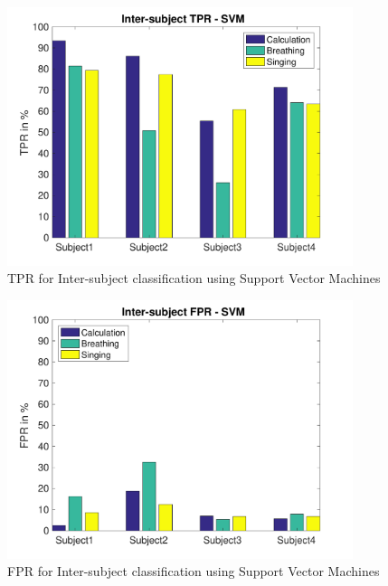     	\begin{figure}[hbtp]
	    	\centering
	    	\includegraphics[width=0.90\textwidth]{Chapter-4/base_tpris}
	    	\caption{TPR for Inter-subject classification using Support Vector Machines}
	    	\label{fig:chap4InterSTPR}
    	\end{figure}

    	\begin{figure}[hbtp]
	    	\centering
	    	\includegraphics[width=0.90\textwidth]{Chapter-4/base_fpris}
	    	\caption{FPR for Inter-subject classification using Support Vector Machines}
	    	\label{fig:chap4InterSFPR}
    	\end{figure}

